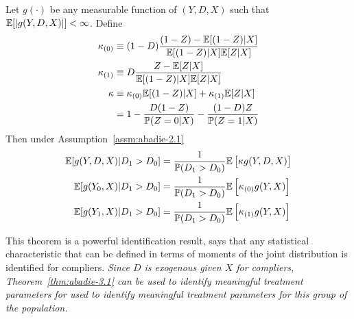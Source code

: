\begin{theorem}
	\label{thm:abadie-3.1}
	Let $g(\cdot)$ be any measurable function of $(Y,D,X)$ such that $\mathbb{E}[|g(Y,D,X)|] < \infty$. Define 
	\begin{align*}
		\kappa_{(0)} &\equiv (1-D)\frac{(1-Z) - \mathbb{E}[(1-Z)|X]}{\mathbb{E}[(1-Z) | X]\mathbb{E}[Z|X]} \\ 
		\kappa_{(1)} &\equiv D\frac{Z - \mathbb{E}[Z|X]}{\mathbb{E}[(1-Z) | X]\mathbb{E}[Z|X]} \\ 
			  \kappa &\equiv \kappa_{(0)}\mathbb{E}[(1-Z)|X] + \kappa_{(1)}\mathbb{E}[Z|X] \\
			  		 &= 1 - \frac{D(1-Z)}{\mathbb{P}(Z= 0|X)} - \frac{(1-D)Z}{\mathbb{P}(Z=1|X)}
	\end{align*}
	Then under Assumption~\ref{assm:abadie-2.1}
	\begin{align}
		\mathbb{E}[g(Y,D,X)|D_1 > D_0] &= \frac{1}{\mathbb{P}(D_1 > D_0)}\mathbb{E}\left[\kappa g(Y,D,X)\right]\\
		\mathbb{E}[g(Y_0,X)|D_1 > D_0] &= \frac{1}{\mathbb{P}(D_1 > D_0)}\mathbb{E}\left[\kappa_{(0)}g(Y,X)\right] \\
		\mathbb{E}[g(Y_1,X)|D_1 > D_0] &= \frac{1}{\mathbb{P}(D_1 > D_0)}\mathbb{E}\left[\kappa_{(1)}g(Y,X)\right]
	\end{align}
\end{theorem}
This theorem is a powerful identification result, says that any statistical characteristic that can be defined in terms of moments of the joint distribution is identified for compliers. \emph{Since $D$ is exogenous given $X$ for compliers, Theorem~\ref{thm:abadie-3.1} can be used to identify meaningful treatment parameters for used to identify meaningful treatment parameters for this group of the population.}


